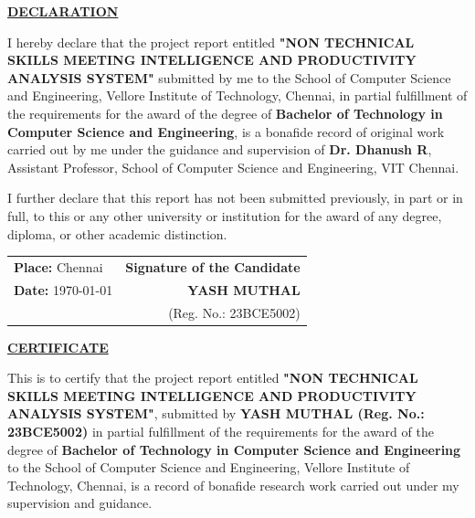 \documentclass[12pt,a4paper,oneside]{report}
\begin{document}
\clearpage
\thispagestyle{plain}
\begin{center}
  {\fontsize{14}{17}\bfseries\underline{DECLARATION}\par}
\end{center}

\vspace{1.2cm}

I hereby declare that the project report entitled \textbf{"NON TECHNICAL SKILLS MEETING INTELLIGENCE AND PRODUCTIVITY ANALYSIS SYSTEM"} submitted by me to the School of Computer Science and Engineering, Vellore Institute of Technology, Chennai, in partial fulfillment of the requirements for the award of the degree of \textbf{Bachelor of Technology in Computer Science and Engineering}, is a bonafide record of original work carried out by me under the guidance and supervision of \textbf{Dr. Dhanush R}, Assistant Professor, School of Computer Science and Engineering, VIT Chennai.

I further declare that this report has not been submitted previously, in part or in full, to this or any other university or institution for the award of any degree, diploma, or other academic distinction.

\vspace{2.5cm}

\noindent
\begin{tabular*}{\textwidth}{@{\extracolsep{\fill}}lr}
\textbf{Place:} Chennai & \textbf{Signature of the Candidate} \\[0.4cm]
\textbf{Date:} \today   & \textbf{YASH MUTHAL} \\
                        & (Reg. No.: 23BCE5002)
\end{tabular*}

\clearpage
\thispagestyle{plain}
\begin{center}
  {\fontsize{14}{17}\bfseries\underline{CERTIFICATE}\par}
\end{center}

\vspace{1.0cm}

This is to certify that the project report entitled \textbf{"NON TECHNICAL SKILLS MEETING INTELLIGENCE AND PRODUCTIVITY ANALYSIS SYSTEM"}, submitted by \textbf{YASH MUTHAL (Reg. No.: 23BCE5002)} in partial fulfillment of the requirements for the award of the degree of \textbf{Bachelor of Technology in Computer Science and Engineering} to the School of Computer Science and Engineering, Vellore Institute of Technology, Chennai, is a record of bonafide research work carried out under my supervision and guidance.
\end{document}
